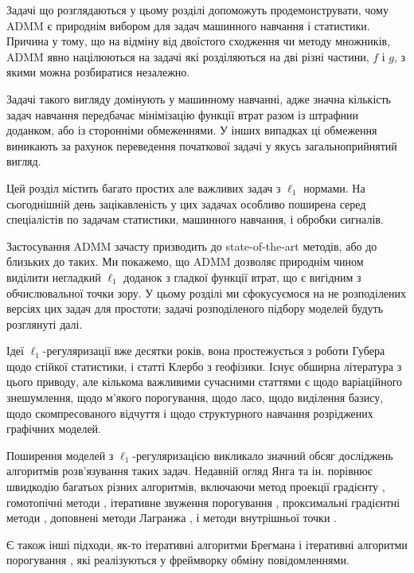 Задачі що розглядаються у цьому розділі допоможуть продемонструвати, чому ADMM є природнім вибором для задач машинного навчання і статистики. Причина у тому, що на відміну від двоїстого сходження чи методу множників, ADMM явно націлюються на задачі які розділяються на дві різні частини, $f$ і $g$, з якими можна розбиратися незалежно. \medskip

Задачі такого вигляду домінують у машинному навчанні, адже значна кількість задач навчання передбачає мінімізацію функції втрат разом із штрафнии доданком, або із сторонніми обмеженнями. У інших випадках ці обмеження виникають за рахунок переведення початкової задачі у якусь загальноприйнятий вигляд.  \medskip

Цей розділ містить багато простих але важливих задач з $\ell_1$ нормами. На сьогоднішній день зацікавленість у цих задачах особливо поширена серед спеціалістів по задачам статистики, машинного навчання, і обробки сигналів. \medskip

Застосування ADMM зачасту призводить до state-of-the-art методів, або до близьких до таких. Ми покажемо, що ADMM дозволяє природнім чином виділити негладкий $\ell_1$ доданок з гладкої функції втрат, що є вигідним з обчислювальної точки зору. У цьому розділі ми сфокусуємося на не розподілених версіях цих задач для простоти; задачі розподіленого підбору моделей будуть розглянуті далі. \medskip

Ідеї $\ell_1$-регуляризації вже десятки років, вона простежується з роботи Губера \cite{100} щодо стійкої статистики, і статті Клербо \cite{38} з геофізики. Існує обширна література з цього приводу, але кількома важливими сучасними статтями є \cite{145} щодо варіаційного знешумлення, \cite{49} щодо м'якого порогування, \cite{156} щодо ласо, \cite{34} щодо виділення базису, \cite{50, 28, 29} щодо скомпресованого відчуття і \cite{123} щодо структурного навчання розріджених графічних моделей. \medskip

Поширення моделей з $\ell_1$-регуляризацією викликало значний обсяг досліджень алгоритмів розв'язування таких задач. Недавній огляд Янга та ін. \cite{173} порівнює швидкодію багатьох різних алгоритмів, включаючи метод проекції градієнту \cite{73, 102}, гомотопічні методи \cite{52}, ітеративне звуження порогування \cite{45}, проксимальні градієнтні методи \cite{132, 133, 11, 12}, доповнені методи Лагранжа \cite{175}, і методи внутрішньої точки \cite{103}. \medskip

Є також інші підходи, як-то ітеративні алгоритми Брегмана \cite{176} і ітеративні алгоритми порогування \cite{51}, які реалізуються у фреймворку обміну повідомленнями.

